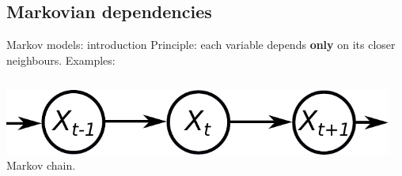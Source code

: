 \documentclass{beamer}
\begin{document}

\subsection{Markovian dependencies}


\begin{frame}{Markov models: introduction}
 Principle: each variable depends \textbf{only} on its closer neighbours. Examples:\vspace{5mm}\\
 \begin{columns}
  \begin{column}{0.4\textwidth}
    \includegraphics[width=\textwidth]{fig/temporal-simple.pdf}\vspace{5mm}\\%
    {\small Markov chain.}\\
  \end{column}
  \begin{column}{0.4\textwidth}

\end{column}
\end{columns}
\end{frame}
\end{document}
